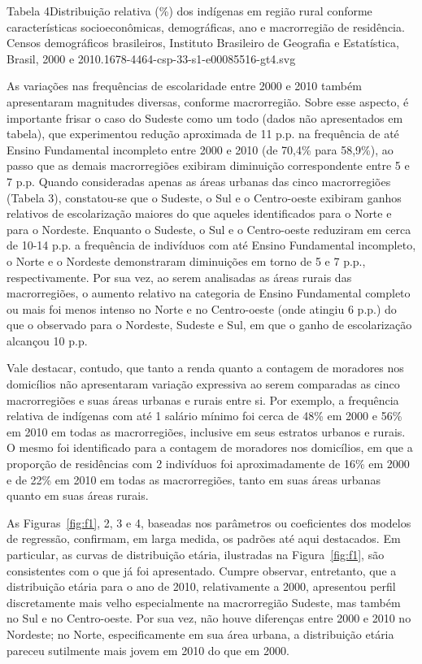 \documentclass{article}
\begin{document}
Tabela 4Distribuição relativa (\%) dos indígenas em região rural conforme
características socioeconômicas, demográficas, ano e macrorregião de residência.
Censos demográficos brasileiros, Instituto Brasileiro de Geografia e
Estatística, Brasil, 2000 e 2010.1678-4464-csp-33-s1-e00085516-gt4.svg

As variações nas frequências de escolaridade entre 2000 e 2010 também
apresentaram magnitudes diversas, conforme macrorregião. Sobre esse aspecto, é
importante frisar o caso do Sudeste como um todo (dados não apresentados em
tabela), que experimentou redução aproximada de 11 p.p. na frequência de até
Ensino Fundamental incompleto entre 2000 e 2010 (de 70,4\% para 58,9\%), ao
passo que as demais macrorregiões exibiram diminuição correspondente entre 5 e 7
p.p. Quando consideradas apenas as áreas urbanas das cinco macrorregiões (Tabela
3), constatou-se que o Sudeste, o Sul e o Centro-oeste exibiram ganhos relativos
de escolarização maiores do que aqueles identificados para o Norte e para o
Nordeste. Enquanto o Sudeste, o Sul e o Centro-oeste reduziram em cerca de 10-14
p.p. a frequência de indivíduos com até Ensino Fundamental incompleto, o Norte e
o Nordeste demonstraram diminuições em torno de 5 e 7 p.p., respectivamente. Por
sua vez, ao serem analisadas as áreas rurais das macrorregiões, o aumento
relativo na categoria de Ensino Fundamental completo ou mais foi menos intenso
no Norte e no Centro-oeste (onde atingiu 6 p.p.) do que o observado para o
Nordeste, Sudeste e Sul, em que o ganho de escolarização alcançou 10 p.p.

Vale destacar, contudo, que tanto a renda quanto a contagem de moradores nos
domicílios não apresentaram variação expressiva ao serem comparadas as cinco
macrorregiões e suas áreas urbanas e rurais entre si. Por exemplo, a frequência
relativa de indígenas com até 1 salário mínimo foi cerca de 48\% em 2000 e 56\%
em 2010 em todas as macrorregiões, inclusive em seus estratos urbanos e rurais.
O mesmo foi identificado para a contagem de moradores nos domicílios, em que a
proporção de residências com 2 indivíduos foi aproximadamente de 16\% em 2000 e
de 22\% em 2010 em todas as macrorregiões, tanto em suas áreas urbanas quanto em
suas áreas rurais.

As Figuras~\ref{fig:f1}, 2, 3 e 4, baseadas nos parâmetros ou coeficientes dos modelos de regressão,
confirmam, em larga medida, os padrões até aqui destacados. Em particular, as
curvas de distribuição etária, ilustradas na Figura~\ref{fig:f1}, são consistentes com o que já foi apresentado. Cumpre observar, entretanto,
que a distribuição etária para o ano de 2010, relativamente a 2000, apresentou
perfil discretamente mais velho especialmente na macrorregião Sudeste, mas
também no Sul e no Centro-oeste. Por sua vez, não houve diferenças entre 2000 e
2010 no Nordeste; no Norte, especificamente em sua área urbana, a distribuição
etária pareceu sutilmente mais jovem em 2010 do que em 2000.
\end{document}

